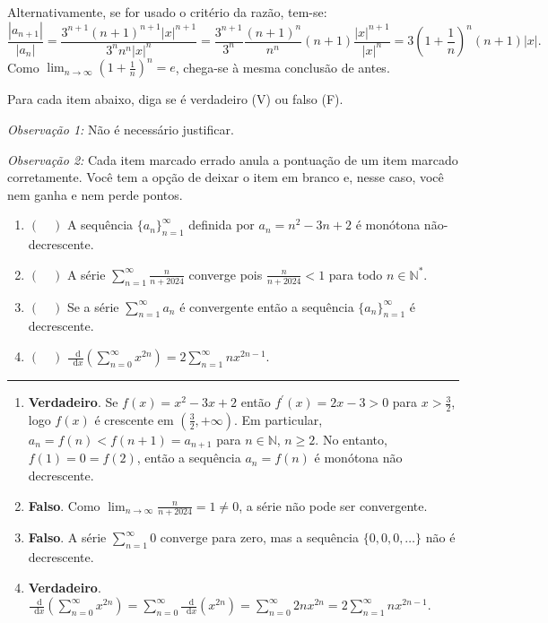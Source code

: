 \documentclass[12pt,a4paper]{article}
\newcommand*\diff{\mathop{}\!\mathrm{d}}
\begin{document}
\begin{ExerciseList}
Alternativamente, se for usado o critério da razão, tem-se:
\[
\frac{|a_{n+1}|}{|a_n|}
= \frac{3^{n+1}(n + 1)^{n+1}|x|^{n+1}}{3^nn^n|x|^n}
= \frac{3^{n+1}}{3^n}
  \frac{(n + 1)^n}{n^n}(n + 1)
  \frac{|x|^{n+1}}{|x|^n}
= 3 \left(1 + \frac{1}{n}\right)^n(n + 1) |x|.
\]
Como $\lim_{n \to \infty} \left(1 + \frac{1}{n}\right)^n = e$, chega-se à mesma conclusão de antes.

\Exercise[title={2,0}] Para cada item abaixo, diga se é verdadeiro (V) ou falso (F).

\emph{Observação 1:} Não é necessário justificar.

\emph{Observação 2:} Cada item marcado errado anula a pontuação de um item marcado corretamente. Você tem a opção de deixar o item em branco e, nesse caso, você nem ganha e nem perde pontos.

\begin{enumerate}
    \item $\boldsymbol{\left(\quad\right)}$ A sequência $\{a_n\}_{n = 1}^\infty$ definida por $a_n = n^2 - 3n + 2$ é monótona não-decrescente.
    \item $\boldsymbol{\left(\quad\right)}$ A série $\sum_{n=1}^\infty \frac{n}{n + 2024}$ converge pois $\frac{n}{n + 2024} < 1$ para todo $n \in \mathbb{N}^*$.
    \item $\boldsymbol{\left(\quad\right)}$ Se a série $\sum_{n=1}^\infty a_n$ é convergente então a sequência $\{a_n\}_{n = 1}^\infty$ é decrescente.
    \item $\boldsymbol{\left(\quad\right)}$ $\frac{\diff}{\diff{x}}\left( \sum_{n=0}^\infty x^{2n}\right) = 2\sum_{n=1}^\infty nx^{2n-1}$.
\end{enumerate}
\rule{\textwidth}{2px}

\Answer
\begin{enumerate}
    \item \textbf{Verdadeiro}. Se $f(x) = x^2 - 3x + 2$ então $f^\prime(x) = 2x - 3 > 0$ para $x > \frac{3}{2}$, logo $f(x)$ é crescente em $(\frac{3}{2}, +\infty)$. Em particular, $a_{n} = f(n) < f(n+1) = a_{n + 1}$ para $n \in \mathbb{N}$, $n \geq 2$. No entanto, $f(1) = 0 = f(2)$, então a sequência $a_n = f(n)$ é monótona não decrescente.
    \item \textbf{Falso}. Como $\lim_{n\to \infty} \frac{n}{n + 2024} = 1 \neq 0$, a série não pode ser convergente.
    \item \textbf{Falso}. A série $\sum_{n=1}^\infty 0$ converge para zero, mas a sequência $\{0, 0, 0, \ldots \}$ não é decrescente.
    \item \textbf{Verdadeiro}. $\frac{\diff}{\diff{x}}\left( \sum_{n=0}^\infty x^{2n}\right)
    = \sum_{n=0}^\infty \frac{\diff}{\diff{x}}\left( x^{2n} \right)
    = \sum_{n=0}^\infty 2n x^{2n}
    = 2\sum_{n=1}^\infty nx^{2n-1}$.
\end{enumerate}


\end{ExerciseList}
\end{document}
